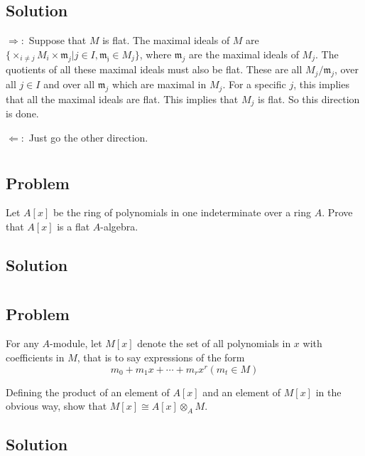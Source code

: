 \documentclass[book,12pt,oneside,openany]{memoir}
\begin{document}
\subsection{Solution}
$\Rightarrow:$ Suppose that $M$ is flat. The maximal ideals of $M$ are $\{\times_{i \neq j} M_i  \times \mathfrak{m}_j | j \in I, \mathfrak{m_j} \in M_j\}$, where $\mathfrak{m}_j$ are the maximal ideals of $M_j$. The quotients of all these maximal ideals must also be flat. These are all $M_j/\mathfrak{m}_j$, over all $j \in I$ and over all $\mathfrak{m}_j$ which are maximal in $M_j$. For a specific $j$, this implies that all the maximal ideals are flat. This implies that $M_j$ is flat. So this direction is done.

$\Leftarrow:$ Just go the other direction.


\section{}
\subsection{Problem}
Let $A[x]$ be the ring of polynomials in one indeterminate over a ring $A$. Prove that $A[x]$ is a flat $A$-algebra.
\subsection{Solution}



\section{}
\subsection{Problem}
For any $A$-module, let $M[x]$ denote the set of all polynomials in $x$ with coefficients in $M$, that is to say expressions of the form \[m_0 + m_1x + \cdots + m_rx^r (m_t \in M)\]

Defining the product of an element of $A[x]$ and an element of $M[x]$ in the obvious way, show that $M[x] \cong A[x] \otimes_{A} M$.

\subsection{Solution}

\section{}
\end{document}

